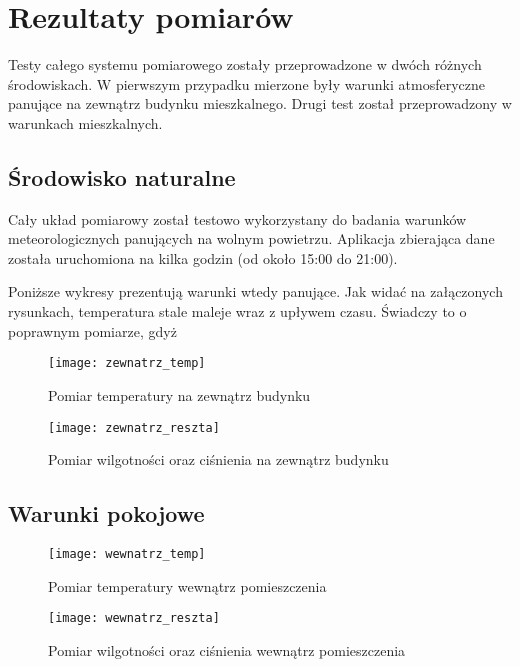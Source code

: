 \chapter{Rezultaty pomiarów}
Testy całego systemu pomiarowego zostały przeprowadzone w dwóch różnych środowiskach. W pierwszym przypadku mierzone były warunki atmosferyczne panujące na zewnątrz budynku mieszkalnego. Drugi test został przeprowadzony w warunkach mieszkalnych.
\section*{Środowisko naturalne}
Cały układ pomiarowy został testowo wykorzystany do badania warunków  meteorologicznych panujących na wolnym powietrzu. Aplikacja zbierająca dane została uruchomiona na kilka godzin (od około 15:00 do 21:00).

Poniższe wykresy prezentują warunki wtedy panujące. Jak widać na załączonych rysunkach, temperatura stale maleje wraz z upływem czasu. Świadczy to o poprawnym pomiarze, gdyż 
\begin{figure}[h!]
\centering
\texttt{[image: zewnatrz\_temp]}
\caption{Pomiar temperatury na zewnątrz budynku}
\label{fig:zewnatrz_temp}
\end{figure}

\begin{figure}[h!]
\centering
\texttt{[image: zewnatrz\_reszta]}
\caption{Pomiar wilgotności oraz ciśnienia na zewnątrz budynku}
\label{fig:zewnatrz_temp}
\end{figure}

\section*{Warunki pokojowe}
\begin{figure}[h!]
\centering
\texttt{[image: wewnatrz\_temp]}
\caption{Pomiar temperatury wewnątrz pomieszczenia}
\label{fig:zewnatrz_temp}
\end{figure}

\begin{figure}[h!]
\centering
\texttt{[image: wewnatrz\_reszta]}
\caption{Pomiar wilgotności oraz ciśnienia wewnątrz pomieszczenia}
\label{fig:zewnatrz_temp}
\end{figure}